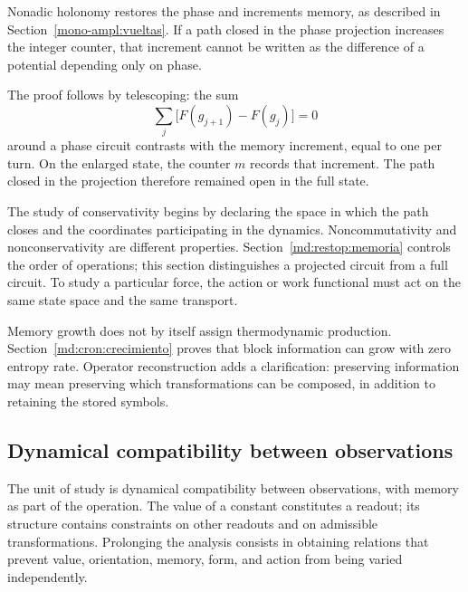 Nonadic holonomy restores the phase and increments memory, as described in
Section~\ref{mono-ampl:vueltas}. If a path closed in the phase projection
increases the integer counter, that increment cannot be written as the
difference of a potential depending only on phase.

The proof follows by telescoping: the sum
\begin{equation}
 \sum_j\bigl[F(g_{j+1})-F(g_j)\bigr]=0
 \label{md:restop:potencial-fase}
\end{equation}
around a phase circuit contrasts with the memory increment, equal
to one per turn. On the enlarged state, the counter $m$ records
that increment. The path closed in the projection therefore
remained open in the full state.

The study of conservativity begins by declaring the space in which
the path closes and the coordinates participating in the
dynamics. Noncommutativity and nonconservativity are different
properties. Section~\ref{md:restop:memoria} controls the order of
operations; this section distinguishes a projected circuit from a full
circuit. To study a particular force, the action or
work functional must act on the same state space and the same transport.

Memory growth does not by itself assign thermodynamic
production. Section~\ref{md:cron:crecimiento} proves that
block information can grow with zero entropy rate.
Operator reconstruction adds a clarification: preserving information
may mean preserving which transformations can be composed,
in addition to retaining the stored symbols.

\subsection{Dynamical compatibility between observations}
\label{md:restop:sintesis}

The unit of study is dynamical compatibility between observations,
with memory as part of the operation. The value of a constant
constitutes a readout; its structure contains constraints on other
readouts and on admissible transformations. Prolonging the
analysis consists in obtaining relations that prevent value, orientation,
memory, form, and action from being varied independently.

